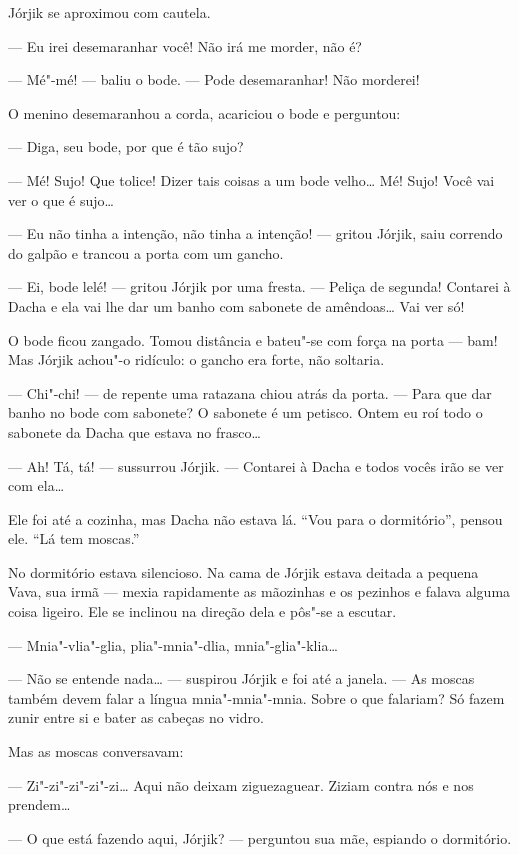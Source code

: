 Jórjik se aproximou com cautela.

--- Eu irei desemaranhar você! Não irá me morder, não é?

--- Mé"-mé! --- baliu o bode. --- Pode desemaranhar! Não morderei!

O menino desemaranhou a corda, acariciou o bode e perguntou:

--- Diga, seu bode, por que é tão sujo?

--- Mé! Sujo! Que tolice! Dizer tais coisas a um bode velho\ldots{} Mé! Sujo!
Você vai ver o que é sujo\ldots{}

--- Eu não tinha a intenção, não tinha a intenção! --- gritou Jórjik,
saiu correndo do galpão e trancou a porta com um gancho.

--- Ei, bode lelé! --- gritou Jórjik por uma fresta. --- Peliça de
segunda! Contarei à Dacha e ela vai lhe dar um banho com sabonete de
amêndoas\ldots{} Vai ver só!

O bode ficou zangado. Tomou distância e bateu"-se com força na porta ---
bam! Mas Jórjik achou"-o ridículo: o gancho era forte, não soltaria.

--- Chi"-chi! --- de repente uma ratazana chiou atrás da porta. --- Para
que dar banho no bode com sabonete? O sabonete é um petisco. Ontem eu
roí todo o sabonete da Dacha que estava no frasco\ldots{}

--- Ah! Tá, tá! --- sussurrou Jórjik. --- Contarei à Dacha e todos vocês
irão se ver com ela\ldots{}

Ele foi até a cozinha, mas Dacha não estava lá. ``Vou para o
dormitório'', pensou ele. ``Lá tem moscas.''

No dormitório estava silencioso. Na cama de Jórjik estava deitada a
pequena Vava, sua irmã --- mexia rapidamente as mãozinhas e os pezinhos
e falava alguma coisa ligeiro. Ele se inclinou na direção dela e pôs"-se
a escutar.

--- Mnia"-vlia"-glia, plia"-mnia"-dlia, mnia"-glia"-klia\ldots{}

--- Não se entende nada\ldots{} --- suspirou Jórjik e foi até a janela. ---
As moscas também devem falar a língua mnia"-mnia"-mnia. Sobre o que
falariam? Só fazem zunir entre si e bater as cabeças no vidro.

Mas as moscas conversavam:

--- Zi"-zi"-zi"-zi"-zi\ldots{} Aqui não deixam ziguezaguear. Ziziam contra nós e
nos prendem\ldots{}

--- O que está fazendo aqui, Jórjik? --- perguntou sua mãe, espiando o
dormitório.

